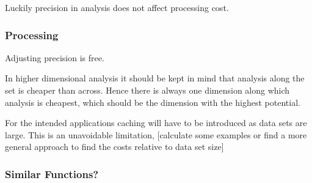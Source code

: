 \documentclass[main.tex]{subfiles}
\begin{document}
  Luckily precision in analysis does not affect processing cost.
  \subsubsection{Processing}
  Adjusting precision is free.
  
  In higher dimensional analysis it should be kept in mind that analysis along the set is cheaper than across. Hence there is always one dimension along which analysis is cheapest, which should be the dimension with the highest potential.
  
  For the intended applications caching will have to be introduced as data sets are large. This is an unavoidable limitation, [calculate some examples or find a more general approach to find  the costs relative to data set size]
  \subsubsection{Similar Functions?}
  
  
\end{document}
